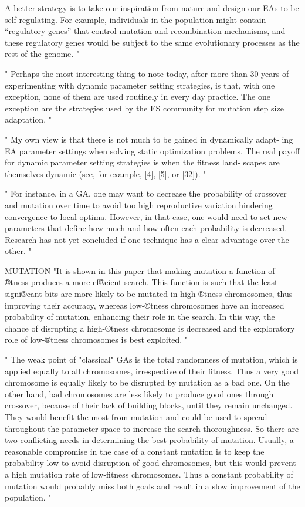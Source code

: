 A better strategy is to take our inspiration from nature and design our EAs to be self-regulating. For example, individuals in the population might contain “regulatory genes” that control mutation and recombination mechanisms, and these regulatory genes would be subject to the same evolutionary processes as the rest of the genome.
"\cite{kacprzyk_parameter_2007}



"
Perhaps the most interesting thing to note today, after more than 30 years of experimenting with dynamic parameter setting strategies, is that, with one exception, none of them are used routinely in every day practice. The one exception are the strategies used by the ES community for mutation step size adaptation.
"\cite{kacprzyk_parameter_2007}

"
My own view is that there is not much to be gained in dynamically adapt- ing EA parameter settings when solving static optimization problems. The real payoff for dynamic parameter setting strategies is when the fitness land- scapes are themselves dynamic (see, for example, [4], [5], or [32]).
"\cite{kacprzyk_parameter_2007}

"
For instance, in a GA, one may want to decrease the probability of crossover and mutation over time to avoid too high reproductive variation hindering convergence to local optima. However, in that case, one would need to set new parameters that define how much and how often each probability is decreased. Research has not yet concluded if one technique has a clear advantage over the other.
"\cite{klampfl_using_nodate}


MUTATION
"It is shown in this paper that making mutation a function of ®tness produces a more ef®cient search. This function is such that the least signi®cant bits are more likely to be mutated in high-®tness chromosomes, thus improving their accuracy, whereas low-®tness chromosomes have an increased probability of mutation, enhancing their role in the search. In this way, the chance of disrupting a high-®tness chromosome is decreased and the exploratory role of low-®tness chromosomes is best exploited.
"
\cite{marsili_libelli_adaptive_2000}

"
The weak point of "classical" GAs is the total randomness of mutation, which is applied equally to all chromosomes, irrespective of their fitness. Thus a very good chromosome is equally likely to be disrupted by mutation as a bad one. On the other hand, bad chromosomes are less likely to produce good ones through crossover, because of their lack of building blocks, until they remain unchanged. They would benefit the most from mutation and could be used to spread throughout the parameter space to increase the search thoroughness. So there are two conflicting needs in determining the best probability of mutation. Usually, a reasonable compromise in the case of a constant mutation is to keep the probability low to avoid disruption of good chromosomes, but this would prevent a high mutation rate of low-fitness chromosomes. Thus a constant probability of mutation would probably miss both goals and result in a slow improvement of the population.
"\cite{marsili_libelli_adaptive_2000}


